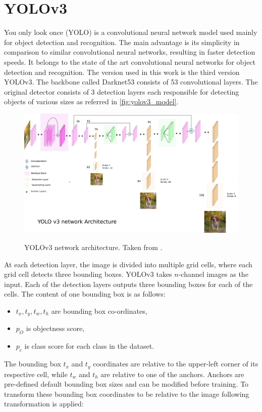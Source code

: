\documentclass[twoside]{ctuthesis}
\theoremstyle{plain}
\theoremstyle{definition}
\theoremstyle{note}
\begin{document}
\section{YOLOv3} \label{s:2.2}
You only look once (YOLO) is a convolutional neural network model used mainly for object detection and recognition\cite{redmon2016look}. The main advantage is its simplicity in comparison to similar convolutional neural networks, resulting in faster detection speeds. It belongs to the state of the art convolutional neural networks for object detection and recognition. The version used in this work is the third version YOLOv3\cite{redmon2018yolov3}. The backbone called Darknet53 consists of 53 convolutional layers. The original detector consists of 3 detection layers each responsible for detecting objects of various sizes as referred in \autoref{fig:yolov3_model}. 
\begin{figure}
	\caption{YOLOv3 network architecture. Taken from \cite{kathuria_2018}.}
	\centering
	\includegraphics[width=\textwidth]{yolov3_model.png}
	\label{fig:yolov3_model}
\end{figure}
At each detection layer, the image is divided into multiple grid cells, where each grid cell detects three bounding boxes. YOLOv3 takes $n$-channel images as the input. Each of the detection layers outputs three bounding boxes for each of the cells. The content of one bounding box is as follows:
\begin{itemize}
	\item $t_x, t_y, t_w, t_h$ are bounding box co-ordinates,
	\item $p_O$ is objectness score,
	\item $p_c$ is class score for each class in the dataset.
\end{itemize}
The bounding box $t_x$ and $t_y$ coordinates are relative to the upper-left corner of its respective cell, while $t_w$ and $t_h$ are relative to one of the anchors. Anchors are pre-defined default bounding box sizes and can be modified before training. To transform these bounding box coordinates to be relative to the image following transformation is applied:
\end{document}
